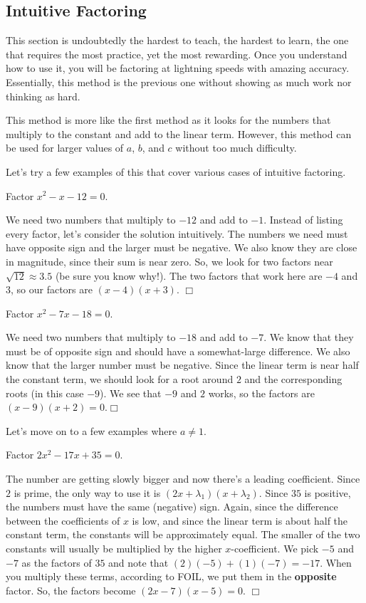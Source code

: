 \documentclass[../book.tex]{subfiles}
\begin{document}
\subsection{Intuitive Factoring}
\noindent This section is undoubtedly the hardest to teach, the hardest to learn, the one that requires the most practice, yet the most rewarding.  Once you understand how to use it, you will be factoring at lightning speeds with amazing accuracy.  Essentially, this method is the previous one without showing as much work nor thinking as hard.

This method is more like the first method as it looks for the numbers that multiply to the constant and add to the linear term.  However, this method can be used for larger values of $a$, $b$, and $c$ without too much difficulty.

Let's try a few examples of this that cover various cases of intuitive factoring.
\begin{example}
Factor $x^2-x-12=0$.
\end{example}
\begin{solution}
We need two numbers that multiply to $-12$ and add to $-1$.  Instead of listing every factor, let's consider the solution intuitively.  The numbers we need must have opposite sign and the larger must be negative.  We also know they are close in magnitude, since their sum is near zero.  So, we look for two factors near $\sqrt{12}\approx 3.5$ (be sure you know why!).  The two factors that work here are $-4$ and $3$, so our factors are $(x-4)(x+3)$.  $\Box$
\end{solution}
\begin{example}
Factor $x^2-7x-18=0$.
\end{example}
\begin{solution}
We need two numbers that multiply to $-18$ and add to $-7$.  We know that they must be of opposite sign and should have a somewhat-large difference.  We also know that the larger number must be negative.  Since the linear term is near half the constant term, we should look for a root around $2$ and the corresponding roots (in this case $-9$).  We see that $-9$ and $2$ works, so the factors are $(x-9)(x+2)=0$.$\Box$
\end{solution}
Let's move on to a few examples where $a\neq 1$.
\begin{example}
Factor $2x^2-17x+35=0$.  
\end{example}
\begin{solution}
The number are getting slowly bigger and now there's a leading coefficient.  Since $2$ is prime, the only way to use it is $(2x+\lambda_1)(x+\lambda_2)$.  Since $35$ is positive, the numbers must have the same (negative) sign.  Again, since the difference between the coefficients of $x$ is low, and since the linear term is about half the constant term, the constants will be approximately equal.  The smaller of the two constants will usually be multiplied by the higher $x$-coefficient.  We pick $-5$ and $-7$ as the factors of $35$ and note that $(2)(-5)+(1)(-7)=-17$.  When you multiply these terms, according to FOIL, we put them in the \textbf{opposite} factor.  So, the factors become $(2x-7)(x-5)=0$.  $\Box$
\end{solution}
\end{document}
